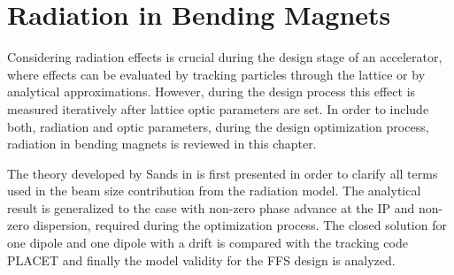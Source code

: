 \chapter{Radiation in Bending Magnets}\label{bendrad}
Considering radiation effects is crucial during the design stage of an accelerator, where effects can be evaluated by tracking particles through the lattice or by analytical approximations. However, during the design process this effect is measured iteratively after lattice optic parameters are set. In order to include both, radiation and optic parameters, during the design optimization process, radiation in bending magnets is reviewed in this chapter.\par
The theory developed by Sands in \cite{Sands} is first presented in order to clarify all terms used in the beam size contribution from the radiation model. The analytical result is generalized to the case with non-zero phase advance at the IP and non-zero dispersion, required during the optimization process. The closed solution for one dipole and one dipole with a drift is compared with the tracking code PLACET \cite{Placet} and finally the model validity for the FFS design is analyzed.
